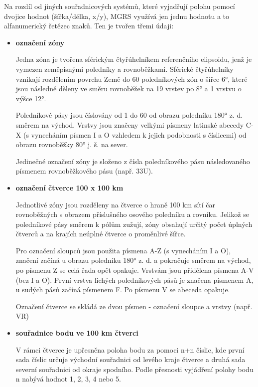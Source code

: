 Na rozdíl od jiných souřadnicových systémů, které vyjadřují polohu
pomocí dvojice hodnot (šířka/délka, x/y), MGRS využívá jen jednu
hodnotu a to alfanumerický řetězec znaků. Ten je tvořen třemi údaji:

\begin{itemize}
	\item \textbf{označení zóny}
	
          Jedna zóna je tvořena sférickým čtyřúhelníkem referenčního
          elipsoidu, jenž je vymezen zeměpisnými poledníky a
          rovnoběžkami. Sférické čtyřúhelníky vznikají rozdělením
          povrchu Země do 60 poledníkových zón o šířce 6°, které jsou
          následně děleny ve směru rovnoběžek na 19 vrstev po 8° a 1
          vrstvu o výšce 12°.
	
          Poledníkové pásy jsou číslovány od 1 do 60 od obrazu
          poledníku 180° z. d. směrem na východ. Vrstvy jsou značeny
          velkými písmeny latinské abecedy C-X (s vynecháním písmen I
          a O vzhledem k jejich podobnosti s číslicemi) od obrazu
          rovnoběžky 80° j. š. na sever.
	
          Jedinečné označení zóny je složeno z čísla poledníkového
          pásu následovaného písmenem rovnoběžkového pásu (např. 33U).
	
	\item \textbf{označení čtverce 100 x 100 km}
	
          Jednotlivé zóny jsou rozděleny na čtverce o hraně 100 km
          sítí čar rovnoběžných s obrazem příslušného osového
          poledníku a rovníku. Jelikož se poledníkové pásy směrem k
          pólům zužují, zóny obsahují určitý počet úplných čtverců a
          na krajích neúplné čtverce o proměnlivé šířce.
	
          Pro označení sloupců jsou použita písmena A-Z (s vynecháním
          I a O), značení začíná u obrazu poledníku 180° z. d. a
          pokračuje směrem na východ, po písmenu Z se celá řada opět
          opakuje. Vrstvám jsou přidělena písmena A-V (bez I a
          O). První vrstva lichých poledníkových pásů je značena
          písmenem A, u sudých pásů začíná písmenem F. Po písmenu V se
          abeceda opakuje.
	
          Označení čtverce se skládá ze dvou písmen - označení sloupce
          a vrstvy (např. VR)
		
	\item \textbf{souřadnice bodu ve 100 km čtverci}
	
          V rámci čtverce je upřesněna poloha bodu za pomoci n+n
          číslic, kde první sada číslic určuje východní souřadnici od
          levého kraje čtverce a druhá sada severní souřadnici od
          okraje spodního. Podle přesnosti vyjádření polohy bodu n
          nabývá hodnot 1, 2, 3, 4 nebo 5.
	

\end{itemize}
